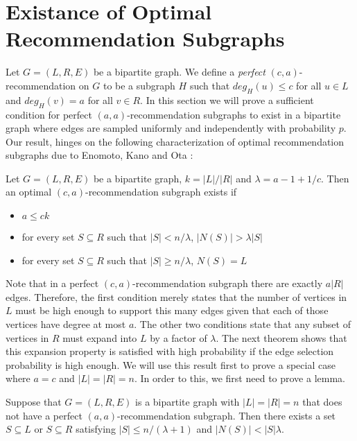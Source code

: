 \section{Existance of Optimal Recommendation Subgraphs}
Let $G=(L,R,E)$ be a bipartite graph. We define a \emph{perfect} $(c,a)$-recommendation on $G$ to be a subgraph $H$ such that $deg_H(u)\leq c$ for all $u\in L$ and $deg_H(v)=a$ for all $v\in R$. In this section we will prove a sufficient condition for perfect $(a,a)$-recommendation subgraphs to exist in a bipartite graph where edges are sampled uniformly and independently with probability $p$. Our result, hinges on the following characterization of optimal recommendation subgraphs due to Enomoto, Kano and Ota \cite{EKO}:

\begin{thm}
Let $G=(L,R,E)$ be a bipartite graph, $k=|L|/|R|$ and $\lambda = a - 1 + 1/c$. Then an optimal $(c,a)$-recommendation subgraph exists if 

\begin{itemize}
\item $a \leq ck$
\item for every set $S\subseteq R$ such that $|S| < n/\lambda$, $|N(S)| > \lambda|S|$
\item for every set $S\subseteq R$ such that $|S| \geq n/\lambda$, $N(S) = L$
\end{itemize}
\end{thm}
 
Note that in a perfect $(c,a)$-recommendation subgraph there are exactly $a|R|$ edges. Therefore, the first condition merely states that the number of vertices in $L$ must be high enough to support this many edges given that each of those vertices have degree at most $a$. The other two conditions state that any subset of vertices in $R$ must expand into $L$ by a factor of $\lambda$. The next theorem shows that this expansion property is satisfied with high probability if the edge selection probability is high enough. We will use this result first to prove a special case where $a=c$ and $|L|=|R|=n$. In order to this, we first need to prove a lemma.

\begin{lem}
Suppose that $G=(L,R,E)$ is a bipartite graph with $|L|=|R|=n$ that does not have a perfect $(a,a)$-recommendation subgraph. Then there exists a set $S\subseteq L$ or $S\subseteq R$ satisfying $|S|\leq n/(\lambda+1)$ and $|N(S)| < |S|\lambda$.
\end{lem}

